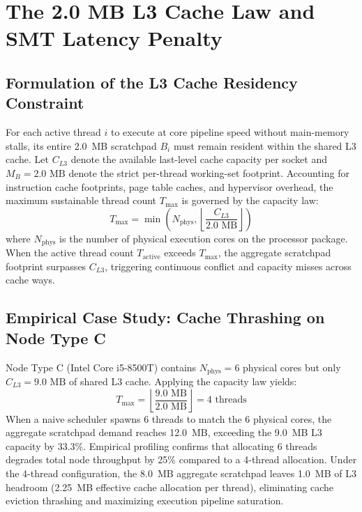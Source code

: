 \documentclass[journal]{IEEEtran}
\begin{document}
\section{The 2.0 MB L3 Cache Law and SMT Latency Penalty}

\subsection{Formulation of the L3 Cache Residency Constraint}
For each active thread $i$ to execute at core pipeline speed without main-memory stalls, its entire 2.0~MB scratchpad $B_i$ must remain resident within the shared L3 cache. Let $C_{L3}$ denote the available last-level cache capacity per socket and $M_B = 2.0\text{ MB}$ denote the strict per-thread working-set footprint. Accounting for instruction cache footprints, page table caches, and hypervisor overhead, the maximum sustainable thread count $T_{\max}$ is governed by the capacity law:
\begin{equation}
T_{\max} = \min\left(N_{\text{phys}}, \left\lfloor \frac{C_{L3}}{2.0\text{ MB}} \right\rfloor\right)
\end{equation}
where $N_{\text{phys}}$ is the number of physical execution cores on the processor package. When the active thread count $T_{\text{active}}$ exceeds $T_{\max}$, the aggregate scratchpad footprint surpasses $C_{L3}$, triggering continuous conflict and capacity misses across cache ways.

\subsection{Empirical Case Study: Cache Thrashing on Node Type C}
Node Type C (Intel Core i5-8500T) contains $N_{\text{phys}} = 6$ physical cores but only $C_{L3} = 9.0\text{ MB}$ of shared L3 cache. Applying the capacity law yields:
\begin{equation}
T_{\max} = \left\lfloor \frac{9.0\text{ MB}}{2.0\text{ MB}} \right\rfloor = 4\text{ threads}
\end{equation}
When a naive scheduler spawns 6 threads to match the 6 physical cores, the aggregate scratchpad demand reaches 12.0~MB, exceeding the 9.0~MB L3 capacity by 33.3\%. Empirical profiling confirms that allocating 6 threads degrades total node throughput by 25\% compared to a 4-thread allocation. Under the 4-thread configuration, the 8.0~MB aggregate scratchpad leaves 1.0~MB of L3 headroom (2.25~MB effective cache allocation per thread), eliminating cache eviction thrashing and maximizing execution pipeline saturation.
\end{document}
